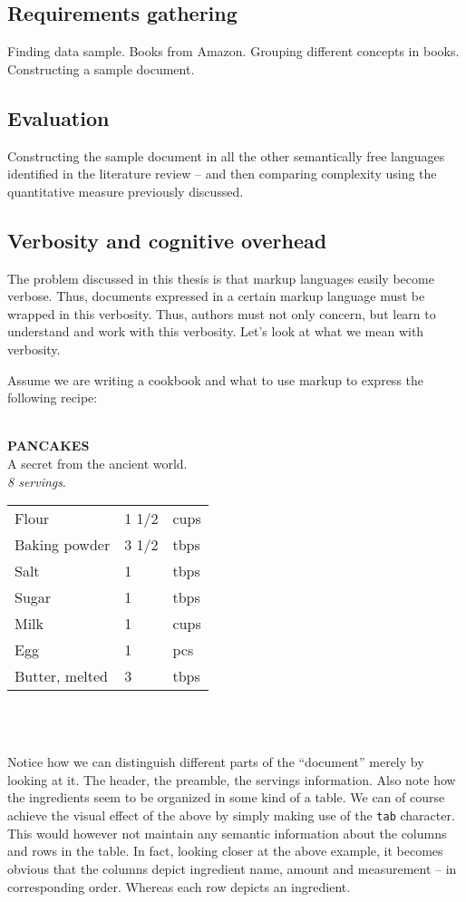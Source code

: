 \documentclass{scrreprt}
\newcommand{\tab}{\hspace*{6pt}}
\newenvironment{example}
{ \hrulefill \vspace{12pt} \\ }
{ \\\\ \vspace{12pt} \hrulefill }
\begin{document}
\subsection{Requirements gathering}
Finding data sample. Books from Amazon.
Grouping different concepts in books.
Constructing a sample document.

\subsection{Evaluation}
Constructing the sample document in all the other semantically free languages identified in the literature review -- and then comparing complexity using the quantitative measure previously discussed.






\subsection{Verbosity and cognitive overhead}
The problem discussed in this thesis is that markup languages easily become verbose. Thus, documents expressed in a certain markup language must be wrapped in this verbosity. Thus, authors must not only concern, but learn to understand and work with this verbosity. Let's look at what we mean with verbosity.

Assume we are writing a cookbook and what to use markup to express the following recipe:

\begin{example}
\tab\tab\tab \textbf{PANCAKES}\\
\tab\tab\tab A secret from the ancient world.\\
\tab\tab\tab \emph{8 servings}.\\

\begin{tabular}{l l l}
Flour & 1 1/2 & cups \\
Baking powder & 3 1/2 & tbps \\
Salt & 1 & tbps \\
Sugar & 1 & tbps \\
Milk & 1 & cups \\
Egg & 1 & pcs\\
Butter, melted & 3 & tbps \\
\end{tabular}
\end{example}

Notice how we can distinguish different parts of the ``document'' merely by looking at it. The header, the preamble, the servings information. Also note how the ingredients seem to be organized in some kind of a table. We can of course achieve the visual effect of the above by simply making use of the \texttt{tab} character. This would however not maintain any semantic information about the columns and rows in the table. In fact, looking closer at the above example, it becomes obvious that the columns depict ingredient name, amount and measurement -- in corresponding order. Whereas each row depicts an ingredient. 
\end{document}

